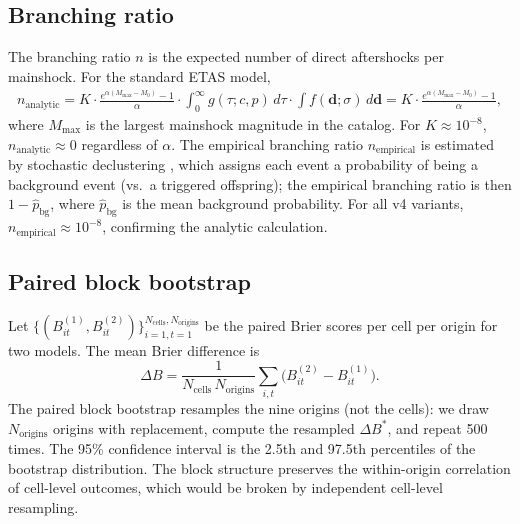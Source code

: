 \documentclass[10pt,a4paper,twocolumn]{article}
\begin{document}
\subsection{Branching ratio}\label{app:branching-ratio}

The branching ratio $n$ is the expected number of direct aftershocks per mainshock. For the standard ETAS model,
\begin{equation}\label{eq:branching-ratio}
\begin{aligned}
n_{\text{analytic}} = K \cdot \frac{e^{\alpha(M_{\max} - M_0)} - 1}{\alpha} \cdot \int_0^\infty g(\tau; c, p)\, d\tau \cdot \int f(\mathbf{d}; \sigma)\, d\mathbf{d} = K \cdot \frac{e^{\alpha(M_{\max} - M_0)} - 1}{\alpha},
\end{aligned}
\end{equation}
where $M_{\max}$ is the largest mainshock magnitude in the catalog. For $K\approx10^{-8}$, $n_{\text{analytic}}\approx 0$ regardless of $\alpha$. The empirical branching ratio $n_{\text{empirical}}$ is estimated by stochastic declustering \cite{zhuang2011}, which assigns each event a probability of being a background event (vs.\ a triggered offspring); the empirical branching ratio is then $1 - \hat p_{\text{bg}}$, where $\hat p_{\text{bg}}$ is the mean background probability. For all v4 variants, $n_{\text{empirical}} \approx 10^{-8}$, confirming the analytic calculation.

\subsection{Paired block bootstrap}\label{app:bootstrap}

Let $\{(B_{it}^{(1)}, B_{it}^{(2)})\}_{i=1, t=1}^{N_{\text{cells}}, N_{\text{origins}}}$ be the paired Brier scores per cell per origin for two models. The mean Brier difference is
\begin{equation}\label{eq:bootstrap-deltaB}
\Delta B = \frac{1}{N_{\text{cells}}\, N_{\text{origins}}} \sum_{i, t} \bigl(B_{it}^{(2)} - B_{it}^{(1)}\bigr).
\end{equation}
The paired block bootstrap resamples the nine origins (not the cells): we draw $N_{\text{origins}}$ origins with replacement, compute the resampled $\Delta B^*$, and repeat 500 times. The 95\% confidence interval is the 2.5th and 97.5th percentiles of the bootstrap distribution. The block structure preserves the within-origin correlation of cell-level outcomes, which would be broken by independent cell-level resampling.
\end{document}
